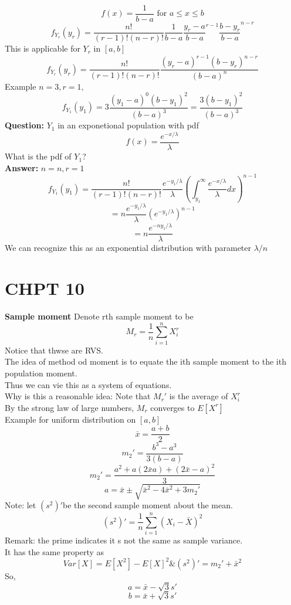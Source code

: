 \documentclass{article}
\begin{document}
$$ f(x) = \frac{1}{b-a} \text{ for } a \leq x \leq b$$
$$ f_{Y_r}(y_r) = \frac{n!}{(r-1)!(n-r)!} \frac{1}{b-a} \frac{y_r -a}{b-a}^{r-1} \frac{b-y_r}{b-a}^{n-r}$$
This is applicable for $Y_r$ in $[a,b]$\\
$$ f_{Y_r}(y_r) = \frac{n!}{(r-1)!(n-r)!} \frac{(y_r -a)^{r-1} (b-y_r)^{n-r}}{(b-a)^n}$$
Example
$n = 3, r = 1, $
$$ f_{Y_1}(y_1) = 3 \frac{(y_1 - a)^0 (b-y_1)^2}{(b-a)^3} = \frac{3(b-y_1)^2}{(b-a)^3}$$
\textbf{Question: } $Y_1$ in an exponetional population with pdf 
$$ f(x) = \frac{e^{-x/\lambda}}{\lambda}$$
What is the pdf of $Y_1$?\\
\textbf{Answer: } $n = n, r = 1$
$$ f_{Y_1}(y_1) = \frac{n!}{(r-1)!(n-r)!} \frac{e^{-y_1/\lambda}}{\lambda} (\int_{y_1}^{\infty} \frac{e^{-x/\lambda}}{\lambda} dx)^{n-1}$$
$$ = n \frac{e^{-y_1/\lambda}}{\lambda} (e^{-y_1/\lambda})^{n-1}$$
$$ = n \frac{e^{-n y_1/\lambda}}{\lambda} $$
We can recognize this as an exponential distribution with parameter $\lambda/n$\\

\section{CHPT 10}
\textbf{Sample moment}
Denote rth sample moment to be 
$$ M_r = \frac{1}{n} \sum_{i=1}^{n} X_i^r$$
Notice that thwse are RVS.\\
The idea of method od moment is to equate the ith sample moment to the ith population moment.\\
Thus we can vie this as a system of equations.\\
Why is this a reasonable idea: Note that $M_r'$ is the average of $X_i^r$\\
By the strong law of large numbers, $M_r$ converges to $E[X^r]$\\
Example for uniform distribution on $[a, b]$\\
$$\bar{x} = \frac{a+b}{2}$$
$$m_2' = \frac{b^3 -a^3}{3(b-a)}$$
$$m_2' = \frac{a^2 + a(2\bar{x}  a) + (2\bar{x}-a)^2}{3}$$
$$ a = \bar{x} \pm \sqrt{\bar{x}^2 -4\bar{x}^2 + 3m_2'} $$
Note: let $(s^2)' $be the second sample moment about the mean.\\
$$ (s^2) ' = \frac{1}{n} \sum_{i=1}^{n} (X_i - \bar{X})^2$$
Remark: the prime indicates it s not the same as sample variance.\\
It has the same property as 
$$ Var[X] = E[X^2] - E[X]^2 \& (s^2)' = m_2 ' + \bar{x}^2$$
So, 
$$ a = \bar{x} - \sqrt{3} s'$$
$$ b = \bar{x} + \sqrt{3} s'$$
\end{document}
